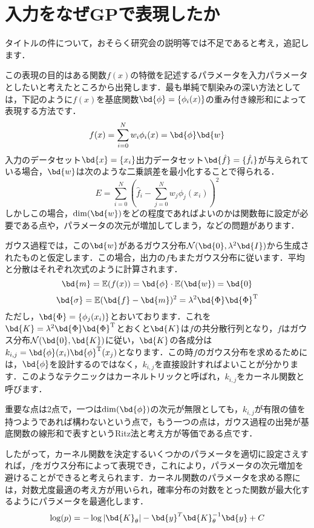 \section{入力をなぜGPで表現したか}
			タイトルの件について，おそらく研究会の説明等では不足であると考え，追記します．
			
			この表現の目的はある関数$ f(x) $の特徴を記述するパラメータを入力パラメータとしたいと考えたところから出発します．最も単純で馴染みの深い方法としては，下記のように$ f(x) $を基底関数$ \bd{\phi} = \{ \phi_i(x) \} $の重み付き線形和によって表現する方法です．
			\begin{equation}\label{eq:LinearEq}
				f(x) = \sum_{i=0}^{N} w_i \phi_i(x)  = \bd{\phi} \bd{w}
			\end{equation}
			入力のデータセット$ \bd{x} = \{x_i\} $出力データセット$ \bd{\hat{f}} = \{\hat{f}_i\}$が与えられている場合，$ \bd{w} $は次のような二乗誤差を最小化することで得られる．
			\begin{equation}\label{eq:ErrorToMinimize}
				E =  \sum_{i=0}^{N} (\hat{f}_i - \sum_{j=0}^{N} w_j \phi_j(x_i))^2
			\end{equation}
			しかしこの場合，$ \dim(\bd{w}) $をどの程度であればよいのかは関数毎に設定が必要である点や，パラメータの次元が増加してしまう，などの問題があります．
			
			ガウス過程では，この$ \bd{w} $があるガウス分布$ \mathcal{N}(\bd{0},\lambda^2 \bd{I}) $から生成されたものと仮定します．この場合，出力の$ f $もまたガウス分布に従います．平均と分散はそれぞれ次式のように計算されます．
			\begin{equation}\label{eq:Avg}
				\bd{m} = \mathbb{E}(f(x)) = \bd{\phi} \cdot \mathbb{E}( \bd{w}) = \bd{0}
			\end{equation}
			\begin{equation}\label{eq:Var}
				\bd{\sigma} = \mathbb{E}(\bd{f} - \bd{m})^2 = \lambda^2  \bd{\Phi}  \bd{\Phi}^{\mathrm{T}}
			\end{equation}
			ただし，$ \bd{\Phi} =\{\phi_j(x_i) \}$とおいております．これを$ \bd{K} = \lambda^2  \bd{\Phi}  \bd{\Phi}^{\mathrm{T}} $とおくと$ \bd{K} $は$ f $の共分散行列となり，$ f $はガウス分布$ \mathcal{N}(\bd{0},\bd{K}) $に従い，$ \bd{K} $の各成分は$ k_{i,j} = \bd{\phi}(x_i) \bd{\phi}^{\mathrm{T}}(x_j) $となります．この時$ f $のガウス分布を求めるためには，$ \bd{\phi} $を設計するのではなく，$ k_{i,j} $を直接設計すればよいことが分かります．このようなテクニックはカーネルトリックと呼ばれ，$ k_{i,j} $をカーネル関数と呼びます．
			
			重要な点は2点で，一つは$ \dim(\bd{\phi}) $の次元が無限としても，$ k_{i,j} $が有限の値を持つようであれば構わないという点で，もう一つの点は，ガウス過程の出発が基底関数の線形和で表すというRitz法と考え方が等価である点です．
			
			したがって，カーネル関数を決定するいくつかのパラメータを適切に設定さえすれば，$ f $をガウス分布によって表現でき，これにより，パラメータの次元増加を避けることができると考えられます．カーネル関数のパラメータを求める際には，対数尤度最適の考え方が用いられ，確率分布の対数をとった関数が最大化するようにパラメータを最適化します．
			\begin{equation}\label{eq:Suudo}
			\log(p) = -\log|\bd{K}_{\theta}| - \bd{y}^T \bd{K}_{\theta}^{-1} \bd{y}+C
			\end{equation}